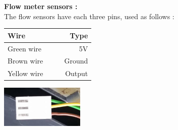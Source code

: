 \documentclass[12pt]{article}
\begin{document}
  \newpage
  \textbf{Flow meter sensors :}\\
  
  The flow sensors have each three pins, used as follows :
  
  \begin{table}[ht]
  \begin{minipage}[b]{0.56\linewidth}
    \centering
  \begin{tabular}{lllr}
   \hline
  Wire & & &Type \\
  \hline
  Green wire & & &5V \\
  Brown wire & & &Ground\\
  Yellow wire & & &Output\\
  \hline
  \end{tabular}
  \end{minipage}\hfill
  \begin{minipage}{0.4\linewidth}
  \centering
  \includegraphics[width=40mm]{./images/realPins}
  \label{fig:realPins}
  \end{minipage}
  \end{table}
  
\end{document}
